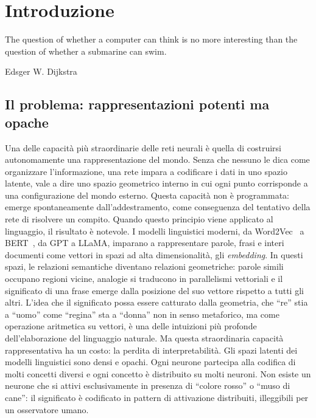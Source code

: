 \section{Introduzione}
\label{sec:01_introduzione}

\epigraph{
    The question of whether a computer can think is no more interesting than the question of whether a submarine can swim.
}{Edsger W. Dijkstra}

\newpage

\subsection{Il problema: rappresentazioni potenti ma opache}
\label{subsec:01_problema}

Una delle capacità più straordinarie delle reti neurali è quella di costruirsi autonomamente una rappresentazione del mondo. Senza che nessuno le dica come organizzare l'informazione, una rete impara a codificare i dati in uno spazio latente, vale a dire uno spazio geometrico interno in cui ogni punto corrisponde a una configurazione del mondo esterno. Questa capacità non è programmata: emerge spontaneamente dall'addestramento, come conseguenza del tentativo della rete di risolvere un compito.
Quando questo principio viene applicato al linguaggio, il risultato è notevole. I modelli linguistici moderni, da Word2Vec~\parencite{mikolov2013efficientestimationwordrepresentations} a BERT~\parencite{devlin2018bert}, da GPT a LLaMA, imparano a rappresentare parole, frasi e interi documenti come vettori in spazi ad alta dimensionalità, gli \textit{embedding}. In questi spazi, le relazioni semantiche diventano relazioni geometriche: parole simili occupano regioni vicine, analogie si traducono in parallelismi vettoriali e il significato di una frase emerge dalla posizione del suo vettore rispetto a tutti gli altri. L'idea che il significato possa essere catturato dalla geometria, che ``re'' stia a ``uomo'' come ``regina'' sta a ``donna'' non in senso metaforico, ma come operazione aritmetica su vettori, è una delle intuizioni più profonde dell'elaborazione del linguaggio naturale.
Ma questa straordinaria capacità rappresentativa ha un costo: la perdita di interpretabilità. Gli spazi latenti dei modelli linguistici sono densi e opachi. Ogni neurone partecipa alla codifica di molti concetti diversi e ogni concetto è distribuito su molti neuroni. Non esiste un neurone che si attivi esclusivamente in presenza di ``colore rosso'' o ``muso di cane'': il significato è codificato in pattern di attivazione distribuiti, illeggibili per un osservatore umano.
